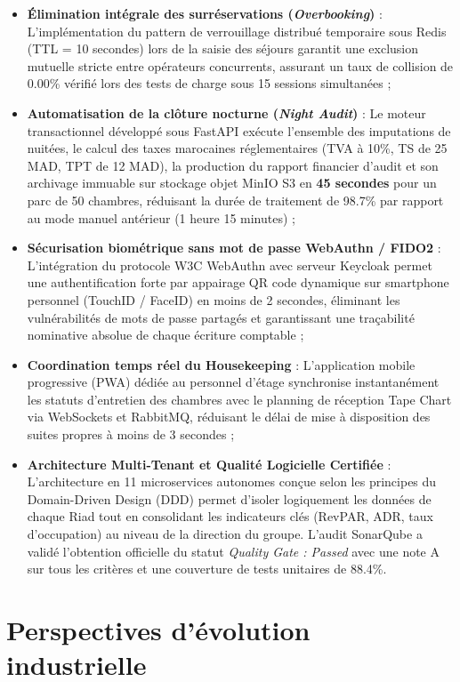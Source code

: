 \begin{itemize}
    \item \textbf{Élimination intégrale des surréservations (\textit{Overbooking})} : L'implémentation du pattern de verrouillage distribué temporaire sous Redis (TTL = 10 secondes) lors de la saisie des séjours garantit une exclusion mutuelle stricte entre opérateurs concurrents, assurant un taux de collision de 0.00\% vérifié lors des tests de charge sous 15 sessions simultanées ;
    \item \textbf{Automatisation de la clôture nocturne (\textit{Night Audit})} : Le moteur transactionnel développé sous FastAPI exécute l'ensemble des imputations de nuitées, le calcul des taxes marocaines réglementaires (TVA à 10\%, TS de 25 MAD, TPT de 12 MAD), la production du rapport financier d'audit et son archivage immuable sur stockage objet MinIO S3 en \textbf{45 secondes} pour un parc de 50 chambres, réduisant la durée de traitement de 98.7\% par rapport au mode manuel antérieur (1 heure 15 minutes) ;
    \item \textbf{Sécurisation biométrique sans mot de passe WebAuthn / FIDO2} : L'intégration du protocole W3C WebAuthn avec serveur Keycloak permet une authentification forte par appairage QR code dynamique sur smartphone personnel (TouchID / FaceID) en moins de 2 secondes, éliminant les vulnérabilités de mots de passe partagés et garantissant une traçabilité nominative absolue de chaque écriture comptable ;
    \item \textbf{Coordination temps réel du Housekeeping} : L'application mobile progressive (PWA) dédiée au personnel d'étage synchronise instantanément les statuts d'entretien des chambres avec le planning de réception Tape Chart via WebSockets et RabbitMQ, réduisant le délai de mise à disposition des suites propres à moins de 3 secondes ;
    \item \textbf{Architecture Multi-Tenant et Qualité Logicielle Certifiée} : L'architecture en 11 microservices autonomes conçue selon les principes du Domain-Driven Design (DDD) permet d'isoler logiquement les données de chaque Riad tout en consolidant les indicateurs clés (RevPAR, ADR, taux d'occupation) au niveau de la direction du groupe. L'audit SonarQube a validé l'obtention officielle du statut \textit{Quality Gate : Passed} avec une note A sur tous les critères et une couverture de tests unitaires de 88.4\%.
\end{itemize}

\section*{Perspectives d'évolution industrielle}

